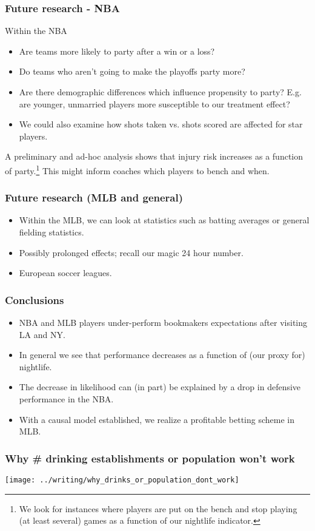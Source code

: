 \documentclass{beamer}
\begin{document}
\begin{frame}   \frametitle{Future research - NBA}
  Within the NBA
  \begin{itemize}     
    \item Are teams more likely to party after a win or a       loss?
    \item Do teams who aren't going to make the playoffs party more?
    \item Are there demographic differences which influence propensity to party? E.g. are younger, unmarried players more susceptible to our treatment effect?
    \item We could also examine how shots taken vs. shots scored are affected for star players.
  \end{itemize}
  \vspace{12pt}  A preliminary and ad-hoc analysis shows that injury risk increases as a function of party.\footnote{We look for instances where players are put on the bench and stop playing (at least several) games as a function of our nightlife indicator.}
  This might inform coaches which players to bench and when.

\end{frame}

\begin{frame}   \frametitle{Future research (MLB and general)}
  \begin{itemize}     
  \item Within the MLB, we can look at statistics such as batting averages or general fielding statistics. 
    \item Possibly prolonged effects; recall our magic 24 hour number.
    \item European soccer leagues.   \end{itemize} \end{frame}

\begin{frame}   \frametitle{Conclusions}
  \begin{itemize}     \item NBA and MLB players under-perform bookmakers expectations after visiting LA and NY.
    \item In general we see that performance decreases as a function of (our proxy for) nightlife.     \item The decrease in likelihood can (in part) be explained by a drop in defensive performance in the NBA.
    \item With a causal model established, we realize a profitable betting scheme in MLB.   \end{itemize} \end{frame}

\begin{frame}   \frametitle{Why \# drinking establishments or population won't work}
  \texttt{[image: ../writing/why\_drinks\_or\_population\_dont\_work]} \end{frame}
\end{document}
